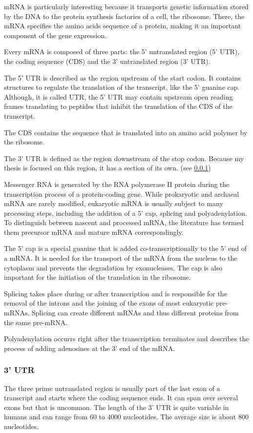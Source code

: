 mRNA is particularly interesting because it transports genetic information stored by the DNA to the protein synthesis factories of a cell, the ribosome. There, the mRNA specifies the amino acids sequence of a protein, making it an important component of the gene expression.

Every mRNA is composed of three parts: the 5' untranslated region (5' UTR), the coding sequence (CDS) and the 3' untranslated region (3' UTR).  

The 5' UTR is described as the region upstream of the start codon. It contains structures to regulate the translation of the transcript, like the 5' guanine cap. Although, it is called UTR, the 5' UTR may contain upstream open reading frames translating to peptides that inhibit the translation of the CDS of the transcript.

The CDS contains the sequence that is translated into an amino acid polymer by the ribosome.

The 3' UTR is defined as the region downstream of the stop codon. Because my thesis is focused on this region, it has a section of its own. (see \ref{3_UTR})

Messenger RNA is generated by the RNA polymerase II protein during the transcription process of a protein-coding gene. While prokaryotic and archaeal mRNA are rarely modified, eukaryotic mRNA is usually subject to many processing steps, including the addition of a 5' cap, splicing and polyadenylation. To distinguish between nascent and processed mRNA, the literature has termed them precursor mRNA and mature mRNA correspondingly.

The 5' cap is a special guanine that is added co-transcriptionally to the 5' end of a mRNA. It is needed for the transport of the mRNA from the nucleus to the cytoplasm and prevents the degradation by exonucleases. The cap is also important for the initiation of the translation in the ribosome. 

Splicing takes place during or after transcription and is responsible for the removal of the introns and the joining of the exons of most eukaryotic pre-mRNAs. Splicing can create different mRNAs and thus different proteins from the same pre-mRNA. 

Polyadenylation occurrs right after the transcription terminates and describes the process of adding adenosines at the 3' end of the mRNA.


\subsubsection{3' UTR}
\label{3_UTR}
The three prime untranslated region is usually part of the last exon of a transcript and starts where the coding sequence ends. It can span over several exons but that is uncommon. The length of the 3' UTR is quite variable in humans and can range from 60 to 4000 nucleotides. The average size is about 800 nucleotides. 

